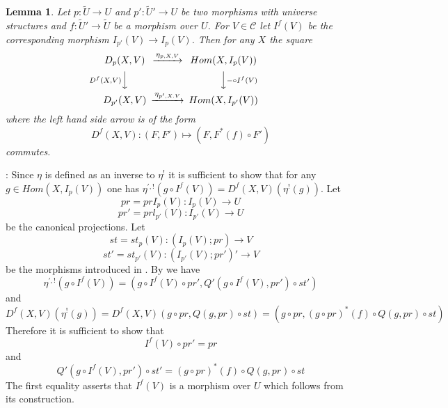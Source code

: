 \documentclass[12pt]{article}
\newenvironment{myproof}{{\bf Proof}:}{\vskip 5mm }
\newtheorem{lemma}[proposition]{Lemma}
\newcommand{\llabel}[1]{\label{#1}}
\newcommand{\sr}{\rightarrow}
\newcommand{\wt}{\widetilde}
\begin{document}
%
%
\begin{lemma}
\llabel{2015.04.02.l4}
Let $p:\wt{U}\sr U$ and $p':\wt{U}'\sr U$ be two morphisms with universe structures and $f:\wt{U}'\sr \wt{U}$ be a morphism over $U$. For $V\in {\mathcal C}$ let $I^f(V)$ be the corresponding morphism $I_{p'}(V)\sr I_p(V)$. Then for any $X$ the square
%
$$
\begin{CD}
D_p(X,V) @>\eta_{p,X,V}>> Hom(X, I_p(V))\\
@V{D^f(X,V)}VV @VV{-\circ I^f(V)} V\\
D_{p'}(X,V) @>\eta_{p',X.V}>> Hom (X, I_{p'}(V))
\end{CD}
$$
%
where the left hand side arrow is of the form 
%
$$D^f(X,V):(F, F')\mapsto (F,F^*(f)\circ F')$$
%
commutes.
\end{lemma}
%
\begin{myproof}
Since $\eta$ is defined as an inverse to $\eta^!$ it is sufficient to show that for any $g\in Hom(X,I_p(V))$ one has $\eta^{',!}(g\circ I^f(V))=D^f(X,V)(\eta^!(g))$. Let
%
$$pr=prI_p(V):I_p(V)\sr U$$
$$pr'=prl_{p'}(V):I_{p'}(V)\sr U$$
%
be the canonical projections. Let
%
$$st=st_p(V):(I_p(V);pr)\sr V$$
$$st'=st_{p'}(V):(I_{p'}(V);pr')'\sr V$$
%
be the morphisms introduced in \cite{fromunivwithPi}. By \cite[Problem 3.8]{fromunivwithPi} we have
%
$$\eta^{',!}(g\circ I^f(V))=(g\circ I^f(V)\circ pr', Q'(g\circ I^f(V), pr')\circ st')$$
%
and
%
$$D^f(X,V)(\eta^!(g))=D^f(X,V)(g\circ pr, Q(g,pr)\circ st)=(g\circ pr, (g\circ pr)^*(f)\circ Q(g,pr)\circ st)$$
%
Therefore it is sufficient to show that
%
$$I^f(V)\circ pr'=pr$$
%
and
%
$$Q'(g\circ I^f(V), pr')\circ st'=(g\circ pr)^*(f)\circ Q(g,pr)\circ st$$
%
The first equality asserts that $I^f(V)$ is a morphism over $U$ which follows from its construction. 


\end{myproof}
\end{document}
